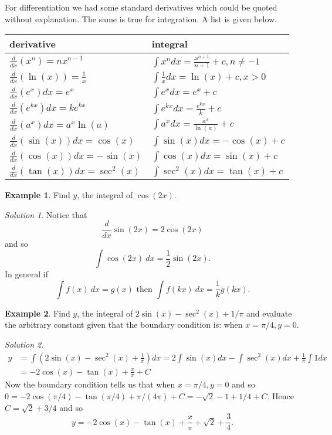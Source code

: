 \documentclass[
  11pt,
  oneside]{book}
\newcommand{\slide}{}
\theoremstyle{definition}
\theoremstyle{definition}
\newtheorem{example}{Example}[chapter]
\theoremstyle{definition}
\theoremstyle{definition}
\theoremstyle{remark}
\newtheorem*{solution}{Solution}
\begin{document}
For differentiation we had some standard derivatives which could be quoted without explanation. The same is true for integration. A list is given below.

\begin{tabular}{l|l}
\hline
derivative & integral\\
\hline
$\frac{d}{dx}(x^n)=nx^{n-1}$ & $\displaystyle\int x^ndx = \frac{x^{n+1}}{n+1}+c, n\ne -1$\\
\hline
$\frac{d}{dx}(\ln(x)) = \frac 1x$ & $\displaystyle\int\frac{1}{x}dx = \ln(x)+c, x>0$\\
\hline
$\frac{d}{dx}(e^x)dx = e^x$ & $\displaystyle\int e^x dx = e^x + c$\\
\hline
$\frac{d}{dx}(e^{kx})dx = ke^{kx}$ & $\displaystyle\int e^{kx} dx = \frac{e^{kx}}{k} + c$\\
\hline
$\frac{d}{dx}(a^x)dx = a^x\ln(a)$ & $\displaystyle\int a^x dx = \frac{a^x}{\ln(a)} + c$\\
\hline
$\frac{d}{dx}(\sin(x))dx=\cos(x)$ & $\displaystyle\int \sin(x)dx=-\cos(x)+c$\\
\hline
$\frac{d}{dx}(\cos(x))dx=-\sin(x)$ & $\displaystyle\int \cos(x)dx=\sin(x)+c$\\
\hline
$\frac{d}{dx}(\tan(x))dx=\sec^2(x)$ & $\displaystyle\int \sec^2(x)dx=\tan(x)+c$\\
\hline
\end{tabular}
\slide

\begin{example}
\protect\hypertarget{exm:cos-example}{}\label{exm:cos-example}Find \(y\), the integral of \(\cos(2x)\).
\end{example}

\begin{solution}
Notice that
\[
\frac{d}{dx}\sin(2x) = 2\cos(2x)
\]
and so
\[
\int\cos(2x)\ dx = \frac12\sin(2x).
\]
In general if
\[
\int f(x)\ dx = g(x)\text{ then }\int f(kx)\ dx = \frac1kg(kx). 
\]
\end{solution}

\slide

\begin{example}
Find \(y\), the integral of \(2\sin(x) - \sec^2(x)+1/\pi\) and evaluate the arbitrary constant given that the boundary condition is: when \(x = \pi/4, y = 0\).
\end{example}

\begin{solution}
\begin{align*}
y& = \int(2\sin(x) - \sec^2(x)+\frac1{\pi})dx = 2\int \sin(x)dx - \int \sec^2(x)dx + \frac{1}{\pi}\int 1dx\\
&= -2\cos(x)-\tan(x)+\frac{x}{\pi}+C
\end{align*}
Now the boundary condition tells us that when \(x=\pi/4, y = 0\) and so \(0=-2\cos(\pi/4)-\tan(\pi/4)+\pi/(4\pi)+C = -\sqrt{2}-1+1/4+C\). Hence \(C=\sqrt{2}+3/4\) and so
\[
y = -2\cos(x)-\tan(x)+\frac{x}{\pi}+\sqrt{2}+\frac34.
\]
\end{solution}
\end{document}
